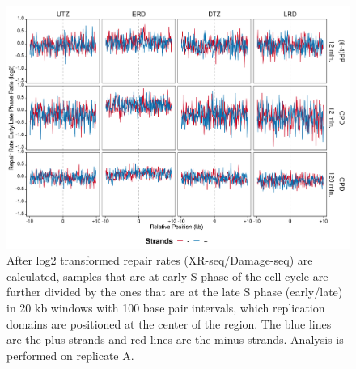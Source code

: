 \begin{figure}[H]
\begin{center}
\includegraphics[width=\textwidth]{Chapters/7_appendix/figures/supfig24}
\caption[Repair rate early/late phase ratio of replication domains in 20 kb (replicate A).]{After log2 transformed repair rates (XR-seq/Damage-seq) are calculated, samples that are at early S phase of the cell cycle are further divided by the ones that are at the late S phase (early/late) in 20 kb windows with 100 base pair intervals, which replication domains are positioned at the center of the region. The blue lines are the plus strands and red lines are the minus strands. Analysis is performed on replicate A.}
\label{supfig:rrel20repdomainA}
\end{center}
\end{figure}

